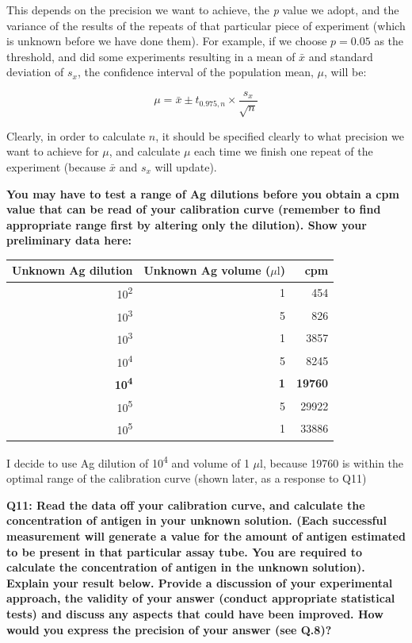 \documentclass[
]{article}
\begin{document}
This depends on the precision we want to achieve, the \emph{p} value we adopt, and the variance of the results of the repeats of that particular piece of experiment (which is unknown before we have done them). For example, if we choose \(p=0.05\) as the threshold, and did some experiments resulting in a mean of \(\bar{x}\) and standard deviation of \(s_x\), the confidence interval of the population mean, \(\mu\), will be:

\[\mu = \bar{x} \pm t_{0.975, n} \times \dfrac{s_x}{\sqrt{n}}\]

Clearly, in order to calculate \(n\), it should be specified clearly to what precision we want to achieve for \(\mu\), and calculate \(\mu\) each time we finish one repeat of the experiment (because \(\bar{x}\) and \(s_x\) will update).

\textbf{You may have to test a range of Ag dilutions before you obtain a cpm value that can be read of your calibration curve (remember to find appropriate range first by altering only the dilution). Show your preliminary data here:}

\begin{longtable}[]{@{}rrr@{}}
\toprule
Unknown Ag dilution & Unknown Ag volume (\(\mu\text{l}\)) & cpm\tabularnewline
\midrule
\endhead
10\textsuperscript{2} & 1 & 454\tabularnewline
10\textsuperscript{3} & 5 & 826\tabularnewline
10\textsuperscript{3} & 1 & 3857\tabularnewline
10\textsuperscript{4} & 5 & 8245\tabularnewline
\textbf{10\textsuperscript{4}} & \textbf{1} & \textbf{19760}\tabularnewline
10\textsuperscript{5} & 5 & 29922\tabularnewline
10\textsuperscript{5} & 1 & 33886\tabularnewline
\bottomrule
\end{longtable}

I decide to use Ag dilution of 10\textsuperscript{4} and volume of 1 \(\mu\text{l}\), because 19760 is within the optimal range of the calibration curve (shown later, as a response to Q11)

\textbf{Q11: Read the data off your calibration curve, and calculate the concentration of antigen in your unknown solution. (Each successful measurement will generate a value for the amount of antigen estimated to be present in that particular assay tube. You are required to calculate the concentration of antigen in the unknown solution). Explain your result below. Provide a discussion of your experimental approach, the validity of your answer (conduct appropriate statistical tests) and discuss any aspects that could have been improved. How would you express the precision of your answer (see Q.8)?}
\end{document}

